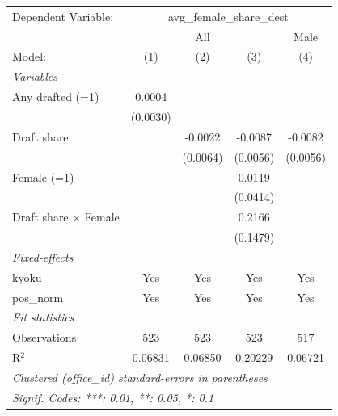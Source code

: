 \begingroup
\centering
\begin{tabular}{lcccc}
   \tabularnewline \midrule \midrule
   Dependent Variable: & \multicolumn{4}{c}{avg\_female\_share\_dest}\\
    & \multicolumn{3}{c}{All} & Male \\ 
   Model:                       & (1)      & (2)      & (3)      & (4)\\  
   \midrule
   \emph{Variables}\\
   Any drafted (=1)             & 0.0004   &          &          &   \\   
                                & (0.0030) &          &          &   \\   
   Draft share                  &          & -0.0022  & -0.0087  & -0.0082\\   
                                &          & (0.0064) & (0.0056) & (0.0056)\\   
   Female (=1)                  &          &          & 0.0119   &   \\   
                                &          &          & (0.0414) &   \\   
   Draft share $\times$ Female  &          &          & 0.2166   &   \\   
                                &          &          & (0.1479) &   \\   
   \midrule
   \emph{Fixed-effects}\\
   kyoku                        & Yes      & Yes      & Yes      & Yes\\  
   pos\_norm                    & Yes      & Yes      & Yes      & Yes\\  
   \midrule
   \emph{Fit statistics}\\
   Observations                 & 523      & 523      & 523      & 517\\  
   R$^2$                        & 0.06831  & 0.06850  & 0.20229  & 0.06721\\  
   \midrule \midrule
   \multicolumn{5}{l}{\emph{Clustered (office\_id) standard-errors in parentheses}}\\
   \multicolumn{5}{l}{\emph{Signif. Codes: ***: 0.01, **: 0.05, *: 0.1}}\\
\end{tabular}
\par\endgroup
